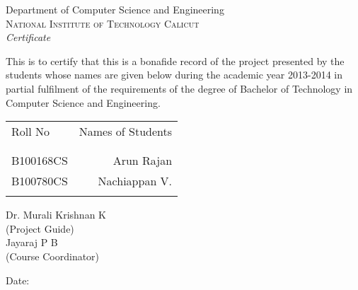 \newpage
\thispagestyle{empty}

\begin{center}

\huge{Department of Computer Science and Engineering}\\[0.5cm]
\normalsize
\textsc{National Institute of Technology Calicut}\\[2.0cm]

\emph{\LARGE Certificate}\\[2.5cm]
\end{center}
\normalsize This is to certify that this is a bonafide record of the project presented by the students whose names are given below during the academic year 2013-2014 in partial fulfilment of the requirements of the degree of Bachelor of Technology in Computer Science and Engineering.\\[1.0cm]

\begin{table}[h]
\centering
\begin{tabular}{lr}
Roll No & Names of Students \\ \\ \hline
\\
B100168CS & Arun Rajan \\
B100780CS & Nachiappan V. \\ \\ \hline 
\end{tabular}
\end{table}

\vfill


\begin{flushright}
Dr. Murali Krishnan K\\
(Project Guide)\\[1.5cm]
Jayaraj P B\\
(Course Coordinator)\\
\end{flushright}

\begin{flushleft}
Date:
\end{flushleft}
